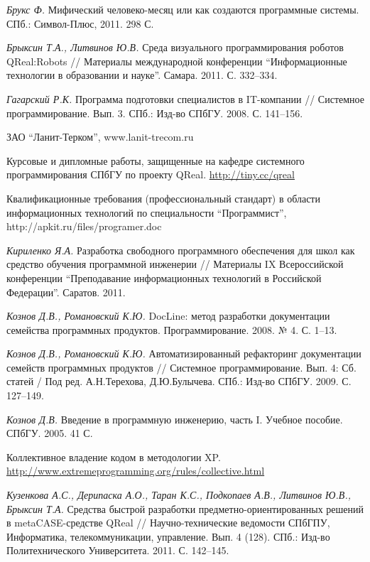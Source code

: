 \documentclass[a4paper]{article}
\begin{document}
\begin{thebibliography}{9001}

   \emph{Брукс Ф.} Мифический человеко-месяц или как создаются программные системы. СПб.: Символ-Плюс, 2011. 298 С.
  
   \emph{Брыксин Т.А., Литвинов Ю.В.} Среда визуального программирования роботов QReal:Robots // Материалы международной конференции ``Информационные технологии в образовании и науке''. Самара. 2011. С. 332--334.
  
   \emph{Гагарский Р.К.} Программа подготовки специалистов в IT-компании // Системное программирование. Вып. 3. СПб.: Изд-во СПбГУ. 2008. С. 141--156.
  
   ЗАО ``Ланит-Терком'', www.lanit-trecom.ru

   Курсовые и дипломные работы, защищенные на кафедре системного программирования СПбГУ по проекту QReal. \url{http://tiny.cc/qreal}

   Квалификационные требования (профессиональный стандарт) в области информационных технологий по специальности ``Программист'', http://apkit.ru/files/programer.doc
  
   \emph{Кириленко Я.А.} Разработка свободного программного обеспечения для школ как средство обучения программной инженерии // Материалы IX Всероссийской конференции ``Преподавание информационных технологий в Российской Федерации''. Саратов. 2011.
  
   \emph{Кознов Д.В., Романовский К.Ю.}  DocLine: метод разработки документации семейства программных продуктов. Программирование. 2008. № 4. С. 1--13.

   \emph{Кознов Д.В., Романовский К.Ю.} Автоматизированный рефакторинг документации семейств программных продуктов // Системное программирование. Вып. 4: Сб. статей / Под ред. А.Н.Терехова, Д.Ю.Булычева. СПб.: Изд-во СПбГУ. 2009. С. 127--149.
  
   \emph{Кознов Д.В.} Введение в программную инженерию, часть I. Учебное пособие. СПбГУ. 2005. 41 С. 

   Коллективное владение кодом в методологии XP. \url{http://www.extremeprogramming.org/rules/collective.html}
  
   \emph{Кузенкова А.С., Дерипаска А.О., Таран К.С., Подкопаев А.В., Литвинов Ю.В., Брыксин Т.А.} Средства быстрой разработки предметно-ориентированных решений в metaCASE-средстве QReal // Научно-технические ведомости СПбГПУ, Информатика, телекоммуникации, управление. Вып. 4 (128). СПб.: Изд-во Политехнического Университета. 2011. С. 142--145.


\end{thebibliography}
\end{document}
